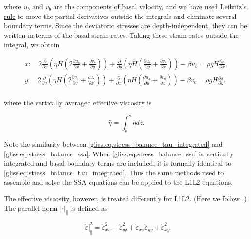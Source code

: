 {\noindent
where $u_b$ and $v_b$ are the components of basal velocity, and we have used
\href{http://en.wikipedia.org/wiki/Leibniz_integral_rule}{Leibniz's rule}
to move the partial derivatives outside the integrals and eliminate several boundary terms.
Since the deviatoric stresses are depth-independent, they can be written in terms of the
basal strain rates. Taking these strain rates outside the integral, we obtain

\begin{equation}
  \label{gliss.eq.stress_balance_tau_integrated}
  \begin{split}
    x: \quad 2 \frac{\partial }{\partial x} \left( \bar{\eta}H \left( 2 \frac{\partial u_b}{\partial x} + \frac{\partial v_b}{\partial y} \right) \right)
             + \frac{\partial }{\partial y} \left( \bar{\eta}H \left(   \frac{\partial u_b}{\partial y} + \frac{\partial v_b}{\partial x} \right) \right)
             - \beta u_b = \rho g H \frac{\partial s}{\partial x}, \\
    y: \quad 2 \frac{\partial }{\partial y} \left( \bar{\eta}H \left( 2 \frac{\partial v_b}{\partial y} + \frac{\partial u_b}{\partial x} \right) \right)
             + \frac{\partial }{\partial x} \left( \bar{\eta}H \left(   \frac{\partial u_b}{\partial y} + \frac{\partial v_b}{\partial x} \right) \right)
             - \beta v_b = \rho g H \frac{\partial s}{\partial y}, \\
  \end{split}
\end{equation}

\noindent
where the vertically averaged effective viscosity is

\begin{equation}
  \bar{\eta} = \int_b^s {\eta dz}.
\end{equation}

\noindent
Note the similarity between \eqref{gliss.eq.stress_balance_tau_integrated} and \eqref{gliss.eq.stress_balance_ssa}.
When \eqref{gliss.eq.stress_balance_ssa} is vertically integrated and basal boundary terms are included,
it is formally identical to \eqref{gliss.eq.stress_balance_tau_integrated}.  Thus the same methods used to
assemble and solve the SSA equations can be applied to the L1L2 equations.

The effective viscosity, however, is treated differently for L1L2.
(Here we follow \citet{Perego2012}.)
The parallel norm $\left| \cdot \right|_{||}$ is defined as

\begin{equation}
  \label{gliss.eq.L1L2_parallel_norm}
  \left| {\dot{\varepsilon }} \right|_{\parallel}^{2} = 
  \dot{\varepsilon }_{xx}^{2} + \dot{\varepsilon }_{yy}^{2} + {{\dot{\varepsilon }}_{xx}}{{\dot{\varepsilon }}_{yy}} + \dot{\varepsilon }_{xy}^{2}
\end{equation}

}
